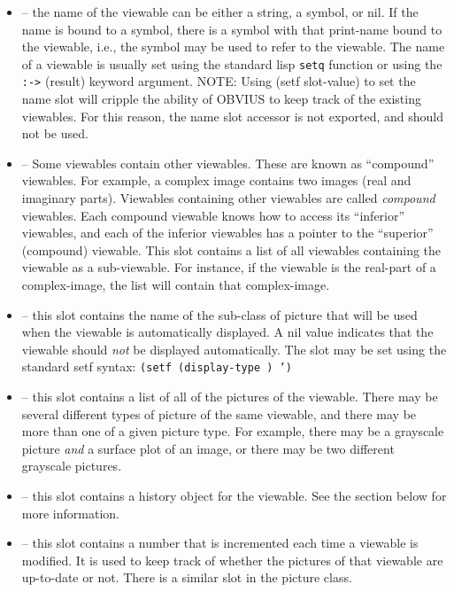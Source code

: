 \begin{itemize}

\item {} -- the name of the viewable can be either a string,
a symbol, or nil.  If the name is bound to a symbol, there is a symbol
with that print-name bound to the viewable, i.e., the symbol may be
used to refer to the viewable.  The name of a viewable is usually set
using the standard lisp {\tt setq} function or using the {\tt :->}
(result) keyword argument.  
NOTE: Using (setf slot-value) to set the
name slot will cripple the ability of OBVIUS to keep track of the
existing viewables.  For this reason, the name slot accessor is not
exported, and should not be used.

\item {} -- Some viewables contain other viewables.
These are known as ``compound'' viewables.  For example, a complex
image contains two images (real and imaginary parts).  Viewables
containing other viewables are called {\em compound} viewables.  Each
compound viewable knows how to access its ``inferior'' viewables, and
each of the inferior viewables has a pointer to the ``superior''
(compound) viewable.  This slot contains a list of all viewables
containing the viewable as a sub-viewable.  For instance, if the
viewable is the real-part of a complex-image, the list will contain
that complex-image.

\item {} -- this slot contains the name of the 
sub-class of picture  that will be used when the viewable is
automatically displayed.  A nil value indicates that the viewable
should {\em not} be displayed automatically.  The slot may be set using the
standard setf syntax: {\tt (setf (display-type )
')}

\item  {} -- this slot contains a list of all of the
pictures of the viewable.  There may be several different types of
picture of the same viewable, and there may be more than one of a
given picture type.  For example, there may be a grayscale picture
{\em and} a surface plot of an image, or there may be two different
grayscale pictures.

\item {} -- this slot contains a history object for the
viewable.  See the section below for more information.

\item {} -- this slot contains a number that is incremented
each time a viewable is modified.  It is used to keep track of whether
the pictures of that viewable are up-to-date or not.  There is a
similar slot in the picture class.


\end{itemize}
